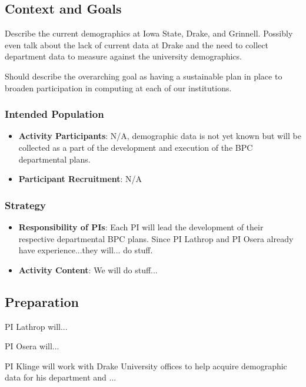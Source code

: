 \documentclass[11pt]{article}
\begin{document}
    \subsection{Context and Goals}
    Describe the current demographics at Iowa State, Drake, and Grinnell.
    Possibly even talk about the lack of current data at Drake and the need to collect department data to measure against the university demographics.

    Should describe the overarching goal as having a sustainable plan in place to broaden participation in computing at each of our institutions.

    \subsubsection{Intended Population}
    \begin{itemize}
    	\item 
	    \textbf{Activity Participants}: N/A, demographic data is not yet known but will be collected as a part of the development and execution of the BPC departmental plans.

	    \item 
	    \textbf{Participant Recruitment}: N/A
    \end{itemize}

    \subsubsection{Strategy}

    \begin{itemize}
    	\item 
	    \textbf{Responsibility of PIs}: Each PI will lead the development of their respective departmental BPC plans.
	    Since PI Lathrop and PI Osera already have experience...they will... do stuff.

	    \item 
	    \textbf{Activity Content}:
	    We will do stuff...
    \end{itemize}

    \subsection{Preparation}
    PI Lathrop will...

    PI Osera will...

    PI Klinge will work with Drake University offices to help acquire demographic data for his department and ...
\end{document}
